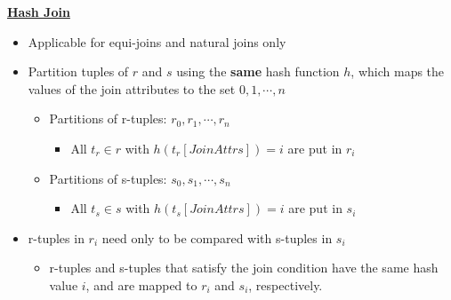 \bigskip
\textbf{\underline{Hash Join}} \\

\begin{minipage}{0.5\textwidth}
\begin{itemize}[label=\(\rhd\)]
    \item Applicable for equi-joins and natural joins only
    \item Partition tuples of $r$ and $s$ using the \textbf{same} hash function $h$, which maps the values of the join attributes to the set $0,1,\cdots,n$
    \begin{itemize}[label=\(\rhd\)]
        \item Partitions of r-tuples: $r_0,r_1,\cdots,r_n$
        \begin{itemize}[label=\(\rhd\)]
            \item All $t_r \in r$ with $h(t_r[JoinAttrs])=i$ are put in $r_i$
        \end{itemize}
        \item Partitions of s-tuples: $s_0,s_1,\cdots, s_n$
        \begin{itemize}[label=\(\rhd\)]
            \item All $t_s \in s$ with $h(t_s[JoinAttrs])=i$ are put in $s_i$
        \end{itemize}
    \end{itemize}
    \item r-tuples in $r_i$ need only to be compared with s-tuples in $s_i$
    \begin{itemize}[label=\(\rhd\)]
        \item r-tuples and s-tuples that satisfy the join condition have the same hash value $i$, and are mapped to $r_i$ and $s_i$, respectively. 
    \end{itemize}
\end{itemize}
\end{minipage}
\hfill
